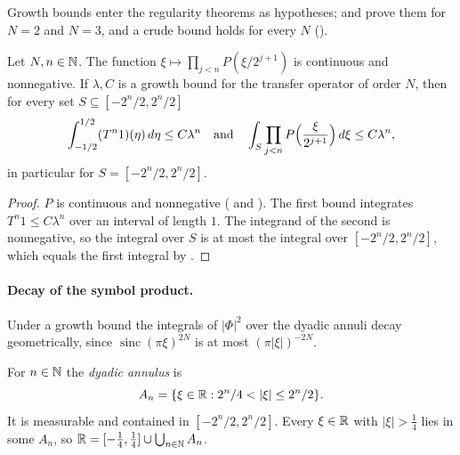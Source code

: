 Growth bounds enter the regularity theorems as hypotheses;  and
 prove them for $N = 2$ and $N = 3$, and a crude bound holds for
every $N$ ().

\begin{lemma}
\label{lem:daub-growth-integrals}
\leanok
{}
Let $N, n \in \mathbb{N}$. The function $\xi \mapsto \prod_{j<n} P(\xi/2^{j+1})$ is continuous and
nonnegative. If $\lambda, C$ is a growth bound for the transfer operator of order $N$, then for
every set $S \subseteq [-2^n/2, 2^n/2]$
\[
  \int_{-1/2}^{1/2} (T^n 1)(\eta) \, d\eta \leq C \lambda^n
  \quad\text{and}\quad
  \int_S \prod_{j<n} P\Bigl(\frac{\xi}{2^{j+1}}\Bigr) \, d\xi \leq C \lambda^n ,
\]
in particular for $S = [-2^n/2, 2^n/2]$.
\end{lemma}

\begin{proof}
\leanok
{}
$P$ is continuous and nonnegative ( and ).
The first bound integrates $T^n 1 \leq C \lambda^n$ over an interval of length $1$. The integrand of
the second is nonnegative, so the integral over $S$ is at most the integral over
$[-2^n/2, 2^n/2]$, which equals the first integral by .
\end{proof}

\paragraph{Decay of the symbol product.}
Under a growth bound the integrals of $|\Phi|^2$ over the dyadic annuli decay geometrically,
since $\operatorname{sinc}(\pi\xi)^{2N}$ is at most $(\pi |\xi|)^{-2N}$.

\begin{definition}
\label{def:daub-annulus}
\leanok
For $n \in \mathbb{N}$ the \emph{dyadic annulus} is
\[
  A_n = \{\xi \in \mathbb{R} : 2^n/4 < |\xi| \leq 2^n/2\} .
\]
It is measurable and contained in $[-2^n/2, 2^n/2]$. Every $\xi \in \mathbb{R}$ with $|\xi| > \frac14$
lies in some $A_n$, so $\mathbb{R} = [-\frac14, \frac14] \cup \bigcup_{n \in \mathbb{N}} A_n$.
\end{definition}

